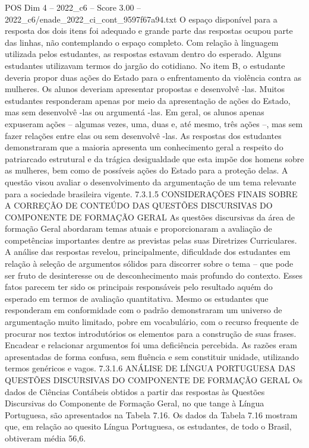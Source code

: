 \begin{textsample}{POS Dim 4 – 2022\_c6 – Score 3.00 – 2022\_c6/enade\_2022\_ci\_cont\_9597f67a94.txt}
O espaço disponível para a resposta dos dois itens foi adequado e grande parte das respostas ocupou parte das linhas, não contemplando o espaço completo.
Com relação à linguagem utilizada pelos estudantes, as respostas estavam dentro do esperado.
Alguns estudantes utilizavam termos do jargão do cotidiano.
No item B, o estudante deveria propor duas ações do Estado para o enfrentamento da violência contra as mulheres.
Os alunos deveriam apresentar propostas e desenvolvê -las.
Muitos estudantes responderam apenas por meio da apresentação de ações do Estado, mas sem desenvolvê -las ou argumentá -las.
Em geral, os alunos apenas expuseram ações – algumas vezes, uma, duas e, até mesmo, três ações –, mas sem fazer relações entre elas ou sem desenvolvê -las.
As respostas dos estudantes demonstraram que a maioria apresenta um conhecimento geral a respeito do patriarcado estrutural e da trágica desigualdade que esta impõe dos homens sobre as mulheres, bem como de possíveis ações do Estado para a proteção delas.
A questão visou avaliar o desenvolvimento da argumentação de um tema relevante para a sociedade brasileira vigente. 7.3.1.5 CONSIDERAÇÕES FINAIS SOBRE A CORREÇÃO DE CONTEÚDO DAS QUESTÕES DISCURSIVAS DO COMPONENTE DE FORMAÇÃO GERAL As questões discursivas da área de formação Geral abordaram temas atuais e proporcionaram a avaliação de competências importantes dentre as previstas pelas suas Diretrizes Curriculares.
A análise das respostas revelou, principalmente, dificuldade dos estudantes em relação à seleção de argumentos sólidos para discorrer sobre o tema – que pode ser fruto de desinteresse ou de desconhecimento mais profundo do contexto.
Esses fatos parecem ter sido os principais responsáveis pelo resultado aquém do esperado em termos de avaliação quantitativa.
Mesmo os estudantes que responderam em conformidade com o padrão demonstraram um universo de argumentação muito limitado, pobre em vocabulário, com o recurso frequente de procurar nos textos introdutórios os elementos para a construção de suas frases.
Encadear e relacionar argumentos foi uma deficiência percebida.
As razões eram apresentadas de forma confusa, sem fluência e sem constituir unidade, utilizando termos genéricos e vagos. 7.3.1.6 ANÁLISE DE LÍNGUA PORTUGUESA DAS QUESTÕES DISCURSIVAS DO COMPONENTE DE FORMAÇÃO GERAL Os dados de Ciências Contábeis obtidos a partir das respostas às Questões Discursivas do Componente de Formação Geral, no que tange à Língua Portuguesa, são apresentados na Tabela 7.16.
Os dados da Tabela 7.16 mostram que, em relação ao quesito Língua Portuguesa, os estudantes, de todo o Brasil, obtiveram média 56,6.

\end{textsample}
